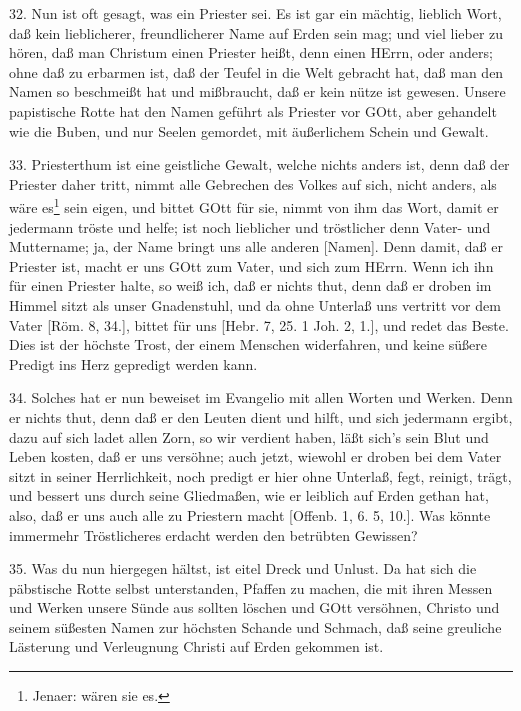 32. Nun ist oft gesagt, was ein Priester sei. Es ist gar ein mächtig, lieblich Wort, daß kein lieblicherer, freundlicherer Name auf Erden sein mag; und viel lieber zu hören, daß man Christum einen Priester heißt, denn einen HErrn, oder anders; ohne daß zu erbarmen ist, daß der Teufel in die Welt gebracht hat, daß man den
Namen so beschmeißt hat und mißbraucht, daß er kein nütze ist gewesen. Unsere papistische Rotte hat den Namen geführt als Priester vor GOtt, aber gehandelt wie die Buben, und nur Seelen gemordet, mit äußerlichem Schein und Gewalt.

33. Priesterthum ist eine geistliche Gewalt, welche nichts anders ist, denn daß der Priester daher tritt, nimmt alle Gebrechen des Volkes auf sich, nicht anders, als wäre es\footnote{Jenaer: wären sie es.} sein eigen, und bittet GOtt für sie, nimmt von ihm das Wort, damit er jedermann tröste und helfe; ist noch lieblicher und tröstlicher denn Vater- und Muttername; ja, der Name bringt uns alle anderen [Namen]. Denn damit, daß er Priester ist, macht er uns GOtt zum Vater, und sich zum HErrn. Wenn ich ihn für einen Priester halte, so weiß ich, daß er nichts thut, denn daß er droben im Himmel sitzt als unser Gnadenstuhl, und da ohne Unterlaß uns vertritt vor dem Vater [Röm. 8, 34.], bittet für uns [Hebr. 7, 25. 1 Joh. 2, 1.], und redet das Beste. Dies ist der höchste Trost, der einem Menschen widerfahren, und keine süßere Predigt ins Herz gepredigt werden kann.

34. Solches hat er nun beweiset im Evangelio mit allen Worten und Werken. Denn er nichts thut, denn daß er den Leuten dient und hilft, und sich jedermann ergibt, dazu auf sich ladet allen Zorn, so wir verdient haben, läßt sich’s sein Blut und Leben kosten, daß er uns versöhne; auch jetzt, wiewohl er droben bei dem Vater sitzt in seiner Herrlichkeit, noch predigt er hier ohne Unterlaß, fegt, reinigt, trägt, und bessert uns durch seine Gliedmaßen, wie er leiblich auf Erden gethan hat, also, daß er uns auch alle zu Priestern macht [Offenb. 1, 6. 5, 10.]. Was könnte immermehr Tröstlicheres erdacht werden den betrübten Gewissen?

35. Was du nun hiergegen hältst, ist eitel Dreck und Unlust. Da hat sich die päbstische Rotte selbst unterstanden, Pfaffen zu machen, die mit ihren Messen und Werken unsere Sünde aus sollten löschen und GOtt versöhnen, Christo und seinem süßesten Namen zur höchsten Schande und Schmach, daß seine greuliche Lästerung und Verleugnung Christi auf Erden gekommen ist.

